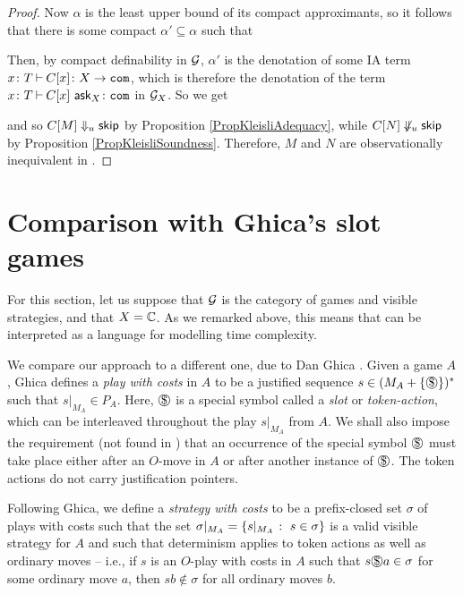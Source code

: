 \begin{proof}
  Now $\alpha$ is the least upper bound of its compact approximants, so it follows that there is some compact $\alpha'\subseteq \alpha$ such that
  Then, by compact definability in $\mathcal G$, $\alpha'$ is the denotation of some IA term $x\colon T \mathbin{\vdash} C[x]\colon X \to {\mathtt{com}}$, which is therefore the denotation of the term $x\colon T \mathbin{\vdash} C[x]\,\operatorname{{\mathsf{ask}}}_X \colon {\mathtt{com}}$ in $\mathcal G_X$.
  So we get
  and so $C[M]\Downarrow_u{\mathsf{skip}}$ by Proposition \ref{PropKleisliAdequacy}, while $C[N] \not\Downarrow_u {\mathsf{skip}}$ by Proposition \ref{PropKleisliSoundness}.
  Therefore, $M$ and $N$ are observationally inequivalent in \IAX.
\end{proof}

\section{Comparison with Ghica's slot games}

For this section, let us suppose that $\mathcal G$ is the category of games and visible strategies, and that $X=\mathbb{C}$.  
As we remarked above, this means that \IAX can be interpreted as a language for modelling time complexity.

We compare our approach to a different one, due to Dan Ghica \cite{SlotGames}.  
Given a game $A$, Ghica defines a \emph{play with costs} in $A$ to be a justified sequence $s\in (M_A + \{\slot\})^*$ such that $s\vert_{M_A}\in P_A$.
Here, $\slot$ is a special symbol called a \emph{slot} or \emph{token-action}, which can be interleaved throughout the play $s\vert_{M_A}$ from $A$.  
We shall also impose the requirement (not found in \cite{SlotGames}) that an occurrence of the special symbol $\slot$ must take place either after an $O$-move in $A$ or after another instance of $\slot$.
The token actions do not carry justification pointers.

Following Ghica, we define a \emph{strategy with costs} to be a prefix-closed set $\sigma$ of plays with costs such that the set $\sigma\vert_{M_A} = \{s\vert_{M_A}\;\colon\; s\in \sigma\}$ is a valid visible strategy for $A$ and such that determinism applies to token actions as well as ordinary moves -- i.e., if $s$ is an $O$-play with costs in $A$ such that $s\slot a\in\sigma$ for some ordinary move $a$, then $sb\not\in\sigma$ for all ordinary moves $b$.

